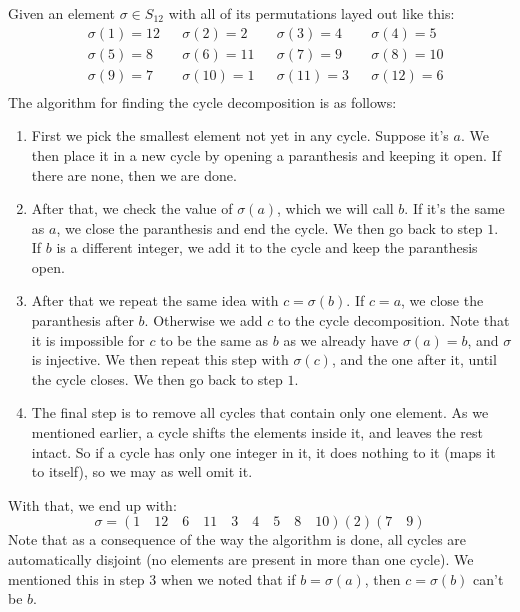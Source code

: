 \documentclass[12pt]{article}
\begin{document}
    Given an element $\sigma \in S_{12}$ with all of its permutations
    layed out like this:
    \begin{align*}
        & \sigma(1) = 12 & &  \sigma(2) = 2
        & & \sigma(3) = 4   & & \sigma(4) = 5  \\
        & \sigma(5) = 8 & & \sigma(6) = 11
        & &\sigma(7) = 9   & & \sigma(8) = 10  \\
        & \sigma(9) = 7 & & \sigma(10) = 1
        & & \sigma(11) = 3   & & \sigma(12) = 6  \\
    \end{align*}
    The algorithm for finding the cycle decomposition is as follows:
    \begin{enumerate}
        \item 
            First we pick the smallest element not yet in any cycle.
            Suppose it's $a$.
            We then place it in a new cycle
            by opening a paranthesis and keeping it open.
            If there are none, then we are done.
        \item
            After that, we check the value of $\sigma(a)$,
            which we will call $b$.
            If it's the same as $a$, we close the paranthesis
            and end the cycle.
            We then go back to step $1$.
            If $b$ is a different integer,
            we add it to the cycle
            and keep the paranthesis open.
        \item
            After that we repeat the same idea with $c = \sigma(b)$.
            If $c = a$, we close the paranthesis after $b$.
            Otherwise we add $c$ to the cycle decomposition.
            Note that it is impossible for $c$ to be the same as $b$
            as we already have $\sigma(a) = b$,
            and $\sigma$ is injective.
            We then repeat this step with $\sigma(c)$,
            and the one after it, until the cycle closes.
            We then go back to step $1$.
        \item
            The final step is to remove all cycles
            that contain only one element.
            As we mentioned earlier,
            a cycle shifts the elements inside it,
            and leaves the rest intact.
            So if a cycle has only one integer in it,
            it does nothing to it (maps it to itself),
            so we may as well omit it.
    \end{enumerate}
    With that, we end up with:
    \[ \sigma = (1 \quad 12 \quad 6 \quad 11 \quad 3 \quad
    4 \quad 5 \quad 8 \quad 10)(2)(7 \quad 9) \]
    Note that as a consequence of the way the algorithm is done,
    all cycles are automatically disjoint 
    (no elements are present in more than one cycle).
    We mentioned this in step $3$ when we noted that if $b = \sigma(a)$,
    then $c = \sigma(b)$ can't be $b$. \\
\end{document}
